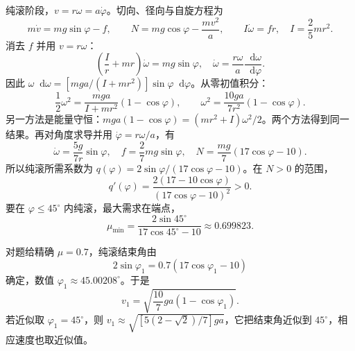 \documentclass[UTF8,fontset=fandol,a4paper,11pt]{ctexart}
\newcommand{\dd}{\mathop{}\!\mathrm{d}}
\newcommand{\result}[1]{\begin{equation*}\boxed{#1}\end{equation*}}
\begin{document}
纯滚阶段，$v=r\omega=a\dot\varphi$。切向、径向与自旋方程为
\[
 m\dot v=mg\sin\varphi-f,\qquad
 N=mg\cos\varphi-\frac{mv^2}{a},\qquad
 I\dot\omega=fr,\quad I=\frac25mr^2.
\]
消去 $f$ 并用 $v=r\omega$：
\[
 \left(\frac Ir+mr\right)\dot\omega=mg\sin\varphi,
 \quad \dot\omega=\frac{r\omega}{a}\frac{\dd\omega}{\dd\varphi}.
\]
因此 $\omega\dd\omega=[mga/(I+mr^2)]\sin\varphi\dd\varphi$。从零初值积分：
\[
 \frac12\omega^2=\frac{mga}{I+mr^2}(1-\cos\varphi),\qquad
 \omega^2=\frac{10ga}{7r^2}(1-\cos\varphi).
\]
另一方法是能量守恒：$mga(1-\cos\varphi)=(mr^2+I)\omega^2/2$。两个方法得到同一结果。再对角度求导并用 $\dot\varphi=r\omega/a$，有
\[
 \dot\omega=\frac{5g}{7r}\sin\varphi,\quad
 f=\frac27mg\sin\varphi,\quad
 N=\frac{mg}{7}(17\cos\varphi-10).
\]
所以纯滚所需系数为 $q(\varphi)=2\sin\varphi/(17\cos\varphi-10)$。在 $N>0$ 的范围，
\[
 q'(\varphi)=\frac{2(17-10\cos\varphi)}{(17\cos\varphi-10)^2}>0.
\]
要在 $\varphi\le45^\circ$ 内纯滚，最大需求在端点，
\[\result{\mu_{\min}=\frac{2\sin45^\circ}{17\cos45^\circ-10}\approx0.699823.}\]

对题给精确 $\mu=0.7$，纯滚结束角由
\[
 2\sin\varphi_1=0.7(17\cos\varphi_1-10)
\]
确定，数值 $\varphi_1\approx45.00208^\circ$。于是
\[
 \result{v_1=\sqrt{\frac{10}{7}ga(1-\cos\varphi_1)}.}
\]
若近似取 $\varphi_1=45^\circ$，则 $v_1\approx\sqrt{[5(2-\sqrt2)/7]ga}$，它把结束角近似到 $45^\circ$，相应速度也取近似值。
\end{document}
